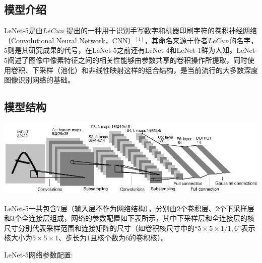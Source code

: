 \documentclass[12pt,a4paper,UTF8,twoside]{book}
\begin{document}
\hypertarget{ux6a21ux578bux4ecbux7ecd}{%
\subsection{模型介绍}\label{ux6a21ux578bux4ecbux7ecd}}

LeNet-5是由\(LeCun\) 提出的一种用于识别手写数字和机器印刷字符的卷积神经网络（Convolutional Neural Network，CNN）\(^{[1]}\)，其命名来源于作者\(LeCun\)的名字，5则是其研究成果的代号，在LeNet-5之前还有LeNet-4和LeNet-1鲜为人知。LeNet-5阐述了图像中像素特征之间的相关性能够由参数共享的卷积操作所提取，同时使用卷积、下采样（池化）和非线性映射这样的组合结构，是当前流行的大多数深度图像识别网络的基础。

\hypertarget{ux6a21ux578bux7ed3ux6784}{%
\subsection{模型结构}\label{ux6a21ux578bux7ed3ux6784}}

\begin{center}\includegraphics[width=0.7\linewidth]{img/02-01} \end{center}

LeNet-5一共包含7层（输入层不作为网络结构），分别由2个卷积层、2个下采样层和3个全连接层组成，网络的参数配置如下表所示，其中下采样层和全连接层的核尺寸分别代表采样范围和连接矩阵的尺寸（如卷积核尺寸中的\(“5\times5\times1/1,6”\)表示核大小为\(5\times5\times1\)、步长为\(1\)且核个数为6的卷积核）。

LeNet-5网络参数配置:
\end{document}
